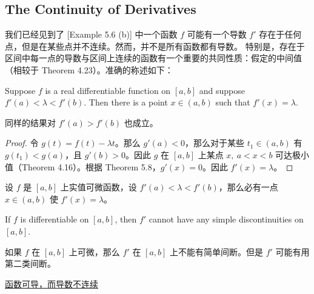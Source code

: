 \documentclass[../poma-notes.tex]{subfiles}
\begin{document}
\subsection*{The Continuity of Derivatives}

我们已经见到了 [Example 5.6 (b)] 中一个函数 $f$ 可能有一个导数 $f'$ 存在于任何点，但是在某些点并不连续。然而，并不是所有函数都有导数。
特别是，存在于区间中每一点的导数与区间上连续的函数有一个重要的共同性质：假定的中间值（相较于 Theorem 4.23）。准确的称述如下：

\begin{theorem}
  Suppose $f$ is a real differentiable function on $[a, b]$ and suppose $f'(a) < \lambda < f'(b)$. Then there is a
  point $x \in (a, b)$ such that $f'(x) = \lambda$.
\end{theorem}

同样的结果对 $f'(a) > f'(b)$ 也成立。

\begin{proof}
  令 $g(t) = f(t) - \lambda t$。那么 $g'(a) < 0$，那么对于某些 $t_1 \in (a,b)$ 有 $g(t_1) < g(a)$，且 $g'(b) > 0$。因此
  $g$ 在 $[a, b]$ 上某点 $x,\ a<x<b$ 可达极小值（Theorem 4.16）。根据 Theorem 5.8，$g'(x) = 0$。因此 $f'(x) = \lambda$。
\end{proof}

\begin{anote}
  设 $f$ 是 $[a, b]$ 上实值可微函数，设 $f'(a) < \lambda < f'(b)$，那么必有一点 $x \in (a, b)$ 使 $f'(x) = \lambda$。
\end{anote}

\begin{corollary}
  If $f$ is differentiable on $[a, b]$, then $f'$ cannot have any simple discontinuities on $[a, b]$.
\end{corollary}

\begin{anote}
  如果 $f$ 在 $[a, b]$ 上可微，那么 $f'$ 在 $[a, b]$ 上不能有简单间断。但是 $f'$ 可能有用第二类间断。

  \href{https://math.stackexchange.com/a/423279/1183566}{函数可导，而导数不连续}
\end{anote}
\end{document}

